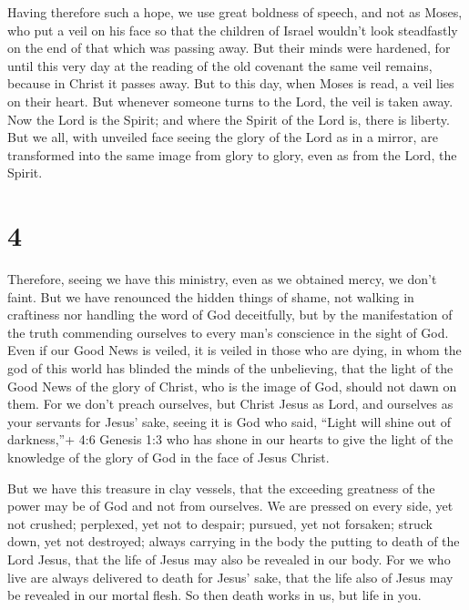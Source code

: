  Having therefore such a hope, we use great boldness of
speech,  and not as Moses, who put a veil on his face so
that the children of Israel wouldn't look steadfastly on the end of that
which was passing away.  But their minds were hardened, for
until this very day at the reading of the old covenant the same veil
remains, because in Christ it passes away.  But to this
day, when Moses is read, a veil lies on their heart.  But
whenever someone turns to the Lord, the veil is taken away.
 Now the Lord is the Spirit; and where the Spirit of the
Lord is, there is liberty.  But we all, with unveiled face
seeing the glory of the Lord as in a mirror, are transformed into the
same image from glory to glory, even as from the Lord, the Spirit.

\hypertarget{section-3}{%
\section{4}\label{section-3}}

 Therefore, seeing we have this ministry, even as we
obtained mercy, we don't faint.  But we have renounced the
hidden things of shame, not walking in craftiness nor handling the word
of God deceitfully, but by the manifestation of the truth commending
ourselves to every man's conscience in the sight of God. 
Even if our Good News is veiled, it is veiled in those who are dying,
 in whom the god of this world has blinded the minds of the
unbelieving, that the light of the Good News of the glory of Christ, who
is the image of God, should not dawn on them.  For we don't
preach ourselves, but Christ Jesus as Lord, and ourselves as your
servants for Jesus' sake,  seeing it is God who said,
``Light will shine out of darkness,''+ 4:6 Genesis 1:3 who has shone in
our hearts to give the light of the knowledge of the glory of God in the
face of Jesus Christ.

 But we have this treasure in clay vessels, that the
exceeding greatness of the power may be of God and not from ourselves.
 We are pressed on every side, yet not crushed; perplexed,
yet not to despair;  pursued, yet not forsaken; struck down,
yet not destroyed;  always carrying in the body the putting
to death of the Lord Jesus, that the life of Jesus may also be revealed
in our body.  For we who live are always delivered to death
for Jesus' sake, that the life also of Jesus may be revealed in our
mortal flesh.  So then death works in us, but life in you.


